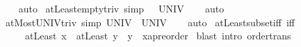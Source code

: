 \begin{isabellebody}
%
\isadelimproof
\ \ %
\endisadelimproof
%
\isatagproof
{}\isamarkupfalse%
\ auto%
\endisatagproof
{\isafoldproof}%
%
\isadelimproof
%
\endisadelimproof
%
\isadelimdocument
%
\endisadelimdocument
%
\isatagdocument
%
\isamarkuptrue%
%
\endisatagdocument
{\isafolddocument}%
%
\isadelimdocument
%
\endisadelimdocument
{}\isamarkupfalse%
\ atLeast{\isacharunderscore}{\kern0pt}empty{\isacharunderscore}{\kern0pt}triv\ {\isacharbrackleft}{\kern0pt}simp{\isacharbrackright}{\kern0pt}{\isacharcolon}{\kern0pt}\ {\isachardoublequoteopen}{\isacharbraceleft}{\kern0pt}{\isacharbraceleft}{\kern0pt}{\isacharbraceright}{\kern0pt}{\isachardot}{\kern0pt}{\isachardot}{\kern0pt}{\isacharbraceright}{\kern0pt}\ {\isacharequal}{\kern0pt}\ UNIV{\isachardoublequoteclose}\isanewline
%
\isadelimproof
\ \ %
\endisadelimproof
%
\isatagproof
{}\isamarkupfalse%
\ auto%
\endisatagproof
{\isafoldproof}%
%
\isadelimproof
\isanewline
%
\endisadelimproof
\isanewline
{}\isamarkupfalse%
\ atMost{\isacharunderscore}{\kern0pt}UNIV{\isacharunderscore}{\kern0pt}triv\ {\isacharbrackleft}{\kern0pt}simp{\isacharbrackright}{\kern0pt}{\isacharcolon}{\kern0pt}\ {\isachardoublequoteopen}{\isacharbraceleft}{\kern0pt}{\isachardot}{\kern0pt}{\isachardot}{\kern0pt}UNIV{\isacharbraceright}{\kern0pt}\ {\isacharequal}{\kern0pt}\ UNIV{\isachardoublequoteclose}\isanewline
%
\isadelimproof
\ \ %
\endisadelimproof
%
\isatagproof
{}\isamarkupfalse%
\ auto%
\endisatagproof
{\isafoldproof}%
%
\isadelimproof
\isanewline
%
\endisadelimproof
\isanewline
{}\isamarkupfalse%
\ atLeast{\isacharunderscore}{\kern0pt}subset{\isacharunderscore}{\kern0pt}iff\ {\isacharbrackleft}{\kern0pt}iff{\isacharbrackright}{\kern0pt}{\isacharcolon}{\kern0pt}\isanewline
\ \ \ \ \ {\isachardoublequoteopen}{\isacharparenleft}{\kern0pt}atLeast\ x\ {\isasymsubseteq}\ atLeast\ y{\isacharparenright}{\kern0pt}\ {\isacharequal}{\kern0pt}\ {\isacharparenleft}{\kern0pt}y\ {\isasymle}\ {\isacharparenleft}{\kern0pt}x{\isacharcolon}{\kern0pt}{\isacharcolon}{\kern0pt}{\isacharprime}{\kern0pt}a{\isacharcolon}{\kern0pt}{\isacharcolon}{\kern0pt}preorder{\isacharparenright}{\kern0pt}{\isacharparenright}{\kern0pt}{\isachardoublequoteclose}\isanewline
%
\isadelimproof
%
\endisadelimproof
%
\isatagproof
{}\isamarkupfalse%
\ {\isacharparenleft}{\kern0pt}blast\ intro{\isacharcolon}{\kern0pt}\ order{\isacharunderscore}{\kern0pt}trans{\isacharparenright}{\kern0pt}%
\endisatagproof
{\isafoldproof}%

\end{isabellebody}
